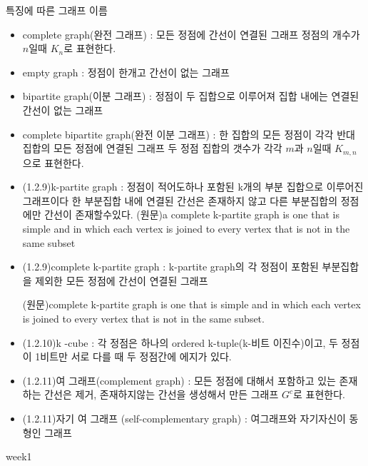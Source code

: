 \documentclass{oblivoir}
\begin{document}
\begin{dfn} 특징에 따른 그래프 이름
    \begin{itemize}
        \item complete graph(완전 그래프) : 모든 정점에 간선이 연결된 그래프 정점의 개수가 $n$일때 $K_n$로 표현한다.
        \item empty graph : 정점이 한개고 간선이 없는 그래프
        \item bipartite graph(이분 그래프) : 정점이 두 집합으로 이루어져 집합 내에는 연결된 간선이 없는 그래프
        \item complete bipartite graph(완전 이분 그래프) : 한 집합의 모든 정점이 각각 반대 집합의 모든 정점에 연결된 그래프 두 정점 집합의 갯수가 각각 $m$과  $n$일때 $K_{m,n}$으로 표현한다.
        \item (1.2.9)k-partite graph : 정점이 적어도하나 포함된 k개의 부분 집합으로 이루어진 그래프이다  한 부분집합 내에 연결된 간선은 존재하지 않고 다른 부분집합의 정점에만 간선이 존재할수있다.
        (원문)a complete k-partite graph is one that is simple and in which each vertex is
        joined to every vertex that is not in the same subset
        \item (1.2.9)complete k-partite graph : k-partite graph의 각 정점이 포함된 부분집합을 제외한 모든 정점에 간선이 연결된 그래프 
        
        (원문)complete k-partite graph is one that is simple and in which each vertex is
        joined to every vertex that is not in the same subset.

        \item (1.2.10)k -cube : 각 정점은 하나의 ordered k-tuple(k-비트 이진수)이고, 두 정점이 1비트만 서로 다를 때 두 정점간에 에지가 있다.
        \item (1.2.11)여 그래프(complement graph) : 모든 정점에 대해서 포함하고 있는 존재하는 간선은 제거, 존재하지않는 간선을 생성해서 만든 그래프 
        $G^{c}$로 표현한다.
        \item (1.2.11)자기 여 그래프 (self-complementary graph) : 여그래프와 자기자신이 동형인 그래프
    \end{itemize}
\end{dfn}

week1

\subsubsection{}
\subsubsection{}
\end{document}
